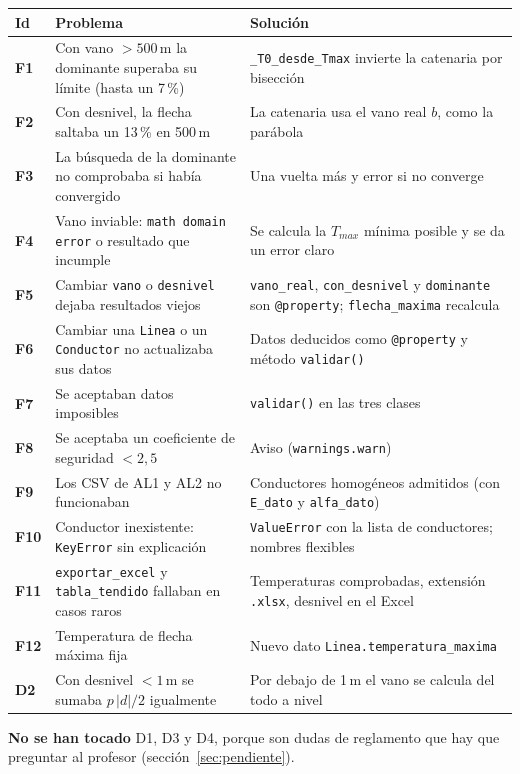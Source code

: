 \documentclass[11pt,a4paper]{article}
\newcommand{\code}[1]{\texttt{#1}}
\begin{document}
\renewcommand{\arraystretch}{1.25}
\begin{longtable}{>{\bfseries}l p{6.2cm} p{6.6cm}}
\toprule
\textbf{Id} & \textbf{Problema} & \textbf{Solución} \\
\midrule
\endhead
F1 & Con vano $>500$\,m la dominante superaba su límite (hasta un 7\,\%) & \code{\_T0\_desde\_Tmax} invierte la catenaria por bisección \\
F2 & Con desnivel, la flecha saltaba un 13\,\% en 500\,m & La catenaria usa el vano real $b$, como la parábola \\
F3 & La búsqueda de la dominante no comprobaba si había convergido & Una vuelta más y error si no converge \\
F4 & Vano inviable: \code{math domain error} o resultado que incumple & Se calcula la $T_{max}$ mínima posible y se da un error claro \\
F5 & Cambiar \code{vano} o \code{desnivel} dejaba resultados viejos & \code{vano\_real}, \code{con\_desnivel} y \code{dominante} son \code{@property}; \code{flecha\_maxima} recalcula \\
F6 & Cambiar una \code{Linea} o un \code{Conductor} no actualizaba sus datos & Datos deducidos como \code{@property} y método \code{validar()} \\
F7 & Se aceptaban datos imposibles & \code{validar()} en las tres clases \\
F8 & Se aceptaba un coeficiente de seguridad $<2{,}5$ & Aviso (\code{warnings.warn}) \\
F9 & Los CSV de AL1 y AL2 no funcionaban & Conductores homogéneos admitidos (con \code{E\_dato} y \code{alfa\_dato}) \\
F10 & Conductor inexistente: \code{KeyError} sin explicación & \code{ValueError} con la lista de conductores; nombres flexibles \\
F11 & \code{exportar\_excel} y \code{tabla\_tendido} fallaban en casos raros & Temperaturas comprobadas, extensión \code{.xlsx}, desnivel en el Excel \\
F12 & Temperatura de flecha máxima fija & Nuevo dato \code{Linea.temperatura\_maxima} \\
D2 & Con desnivel $<1$\,m se sumaba $p\,|d|/2$ igualmente & Por debajo de 1\,m el vano se calcula del todo a nivel \\
\bottomrule
\end{longtable}

\textbf{No se han tocado} D1, D3 y D4, porque son dudas de reglamento que hay que preguntar al profesor (sección~\ref{sec:pendiente}).
\end{document}
